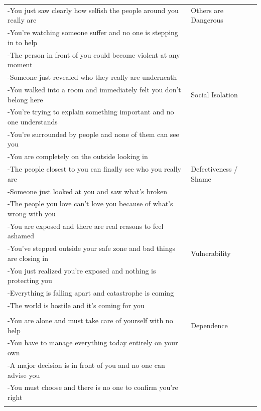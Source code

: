 \documentclass[11pt,oneside]{book}
\begin{document}
\begin{longtable}{>{\raggedright}p{} p{}}
-You just saw clearly how selfish the people around you really are & Others are Dangerous \\
-You're watching someone suffer and no one is stepping in to help &  \\
-The person in front of you could become violent at any moment &  \\
-Someone just revealed who they really are underneath &  \\
\addlinespace

-You walked into a room and immediately felt you don't belong here & Social Isolation \\
-You're trying to explain something important and no one understands &  \\
-You're surrounded by people and none of them can see you &  \\
-You are completely on the outside looking in &  \\
\addlinespace

-The people closest to you can finally see who you really are & Defectiveness / Shame \\
-Someone just looked at you and saw what's broken &  \\
-The people you love can't love you because of what's wrong with you &  \\
-You are exposed and there are real reasons to feel ashamed &  \\
\addlinespace

-You've stepped outside your safe zone and bad things are closing in & Vulnerability \\
-You just realized you're exposed and nothing is protecting you &  \\
-Everything is falling apart and catastrophe is coming &  \\
-The world is hostile and it's coming for you &  \\

\midrule
\multicolumn{2}{l}{\textbf{Autonomy \& Competence}} \\
\midrule

-You are alone and must take care of yourself with no help & Dependence \\
-You have to manage everything today entirely on your own &  \\
-A major decision is in front of you and no one can advise you &  \\
-You must choose and there is no one to confirm you're right &  \\
\addlinespace


\end{longtable}
\end{document}
